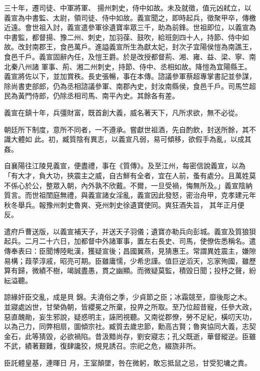 \begin{pinyinscope}
 三十年，遷司徒、中軍將軍、
 揚州刺史，侍中如故。未及就徵，值元凶弒立，以義宣為中書監、太尉，領司徒、侍中如故。義宣聞之，即時起兵，徵聚甲卒，傳檄近遠。會世祖入討，義宣遣參軍徐遺寶率眾三千，助為前鋒。世祖即位，以義宣為中書監，都督揚、豫二州、刺史，加羽葆、鼓吹，給班劍四十人，持節、侍中如故。改封南郡王，食邑萬戶。進謚義宣所生為獻太妃，封次子宜陽侯愷為南譙王，食邑千戶。義宣固辭內任，及愷王爵。於是改授都督荊、湘、雍、益、梁、寧、南北秦八州諸
 軍事、荊、湘二州刺史，持節、侍中、丞相如故。降愷為宜陽縣王。義宣將佐以下，並加賞秩。長史張暢，事在本傳。諮議參軍蔡超專掌書記並參謀，除尚書吏部郎，仍為丞相諮議參軍、南郡內史，封汝南縣侯，食邑千戶。司馬竺超民為黃門侍郎，仍除丞相司馬、南平內史。其餘各有差。



 義宣在鎮十年，兵彊財富，既首創大義，威名著天下，凡所求欲，無不必從。



 朝廷所下制度，意所不同者，一不遵承。嘗獻世祖酒，先自酌飲，封送所餘，其不識大體如
 此。初，臧質陰有異志，以義宣凡弱，易可傾移，欲假手為亂，以成其姦。



 自襄陽往江陵見義宣，便盡禮，事在《質傳》。及至江州，每密信說義宣，以為「有大才，負大功，挾震主之威，自古鮮有全者，宜在人前，蚤有處分。且萬姓莫不係心於公，整眾入朝，內外孰不欣戴。不爾，一旦受禍，悔無所及。」義宣陰納質言。而世祖閨庭無禮，與義宣諸女淫亂，義宣因此發怒，密治舟甲，克孝建元年秋冬舉兵。報豫州刺史魯爽、兗州刺史徐遺寶使同。爽狂酒失旨，
 其年正月便反。



 遣府戶曹送版，以義宣補天子，并送天子羽儀；遺寶亦勒兵向彭城。義宣及質狼狽起兵。二月二十六日，加都督中外諸軍事，置左右長史、司馬，使僚佐悉稱名。遣傳奉表曰：臣聞博陸毗漢，獲疑宣後；昌國翼燕，見猜惠王。常謂異姓震主，嫌隙易構；葭莩淳戚，昭亮可期。臣雖庸懦，少希忠謹。值巨逆滔天，忘家殉國，雖歷算有歸，微績不樹，竭誠盡愚，貫之幽顯。而微疑莫監，積毀日聞；投杼之聲，紛紜溢聽。



 諒緣奸臣交亂，成是貝
 錦。夫澆俗之季，少貞節之臣；冰霜競至，靡後彫之木。並寢處凶世，甘榮偽朝，皆纓冕之所棄，投畀之所取。至乃位超昔寵，任參大政，惡直醜勛，妄生邪說，疑惑明主，誣罔視聽。又南從郡僚，勞不足紀，橫叨天功，以為己力，同弊相扇，圖傾宗社。臧質去歲忠節，勳高古賢；魯爽協同大義，志契金石，此等猜毀，必欲禍陷。昔汲黯尚存，劉安寢志；孔父既逝，華督縱逆。臣雖不武，績著艱難，復肆讒狡，規見誘召。宗祀之危，綴旒非所。



 臣託體皇基，連暉日
 月，王室顛墜，咎在微躬，敢忘抵鼠之忌，甘受犯墉之責。




\end{pinyinscope}
